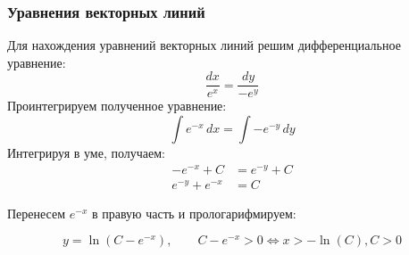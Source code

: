 \begin{frame}\frametitle{Уравнения векторных линий}

Для нахождения уравнений векторных линий решим дифференциальное уравнение:
  \begin{equation}
    \frac{dx}{e^x} = \frac{dy}{-e^y}
    \label{eq:vec_lines}
  \end{equation}
Проинтегрируем полученное уравнение:
  \begin{equation}
    \int e^{-x} \, dx = \int -e^{-y} \, dy
    \label{eq:vec_lines_int}
  \end{equation}
Интегрируя в уме, получаем:
  \begin{align*}
    -e^{-x} + C       &= e^{-y} + C \\
    e^{-y}  + e^{-x}   &= C
    \label{eq:vec_lines_integrated}
  \end{align*}

  Перенесем \(e^{-x}\) в правую часть и прологарифмируем:

  \begin{equation}
    y = \ln(C - e^{-x}), \qquad
    C - e^{-x} > 0 \Longleftrightarrow x > - \ln(C), C > 0
    \label{eq:vec_lines_final}
  \end{equation}

\end{frame}
